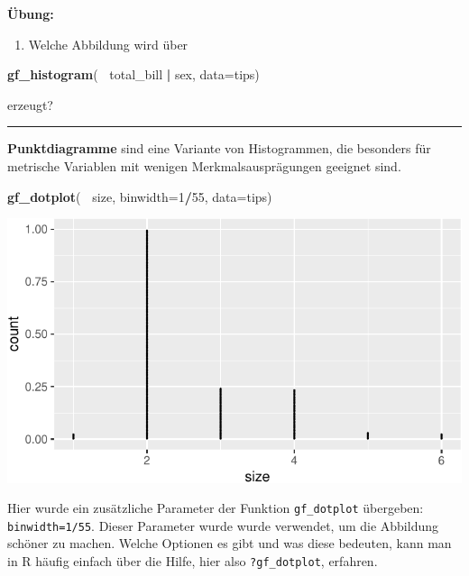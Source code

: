\documentclass[12pt,ngerman,paper=a4,pagesize,DIV=13]{scrreprt}
\newenvironment{Shaded}{\begin{snugshade}}{\end{snugshade}}
\newcommand{\DataTypeTok}[1]{\textcolor[rgb]{0.13,0.29,0.53}{#1}}
\newcommand{\DecValTok}[1]{\textcolor[rgb]{0.00,0.00,0.81}{#1}}
\newcommand{\KeywordTok}[1]{\textcolor[rgb]{0.13,0.29,0.53}{\textbf{#1}}}
\newcommand{\NormalTok}[1]{#1}
\newcommand{\OperatorTok}[1]{\textcolor[rgb]{0.81,0.36,0.00}{\textbf{#1}}}
\newcommand{\StringTok}[1]{\textcolor[rgb]{0.31,0.60,0.02}{#1}}
\providecommand{\tightlist}{%
  \setlength{\itemsep}{0pt}\setlength{\parskip}{0pt}}
\begin{document}
\textbf{Übung:}

\begin{enumerate}
\def\labelenumi{\arabic{enumi}.}
\setcounter{enumi}{1}
\tightlist
\item
  Welche Abbildung wird über
\end{enumerate}

\begin{Shaded}
\begin{Highlighting}[]
\KeywordTok{gf_histogram}\NormalTok{(}\OperatorTok{~}\StringTok{ }\NormalTok{total_bill }\OperatorTok{|}\StringTok{ }\NormalTok{sex, }\DataTypeTok{data=}\NormalTok{tips)}
\end{Highlighting}
\end{Shaded}

erzeugt?

\begin{center}\rule{0.5\linewidth}{\linethickness}\end{center}

\textbf{Punktdiagramme} sind eine Variante von Histogrammen, die
besonders für metrische Variablen mit wenigen Merkmalsausprägungen
geeignet sind.

\begin{Shaded}
\begin{Highlighting}[]
\KeywordTok{gf_dotplot}\NormalTok{(}\OperatorTok{~}\StringTok{ }\NormalTok{size, }\DataTypeTok{binwidth=}\DecValTok{1}\OperatorTok{/}\DecValTok{55}\NormalTok{, }\DataTypeTok{data=}\NormalTok{tips)}
\end{Highlighting}
\end{Shaded}

\includegraphics{DatenerhebungStatistik-Uebung_files/figure-latex/unnamed-chunk-45-1.pdf}

Hier wurde ein zusätzliche Parameter der Funktion \texttt{gf\_dotplot}
übergeben: \texttt{binwidth=1/55}. Dieser Parameter wurde wurde
verwendet, um die Abbildung schöner zu machen. Welche Optionen es gibt
und was diese bedeuten, kann man in R häufig einfach über die Hilfe,
hier also \texttt{?gf\_dotplot}, erfahren.
\end{document}
